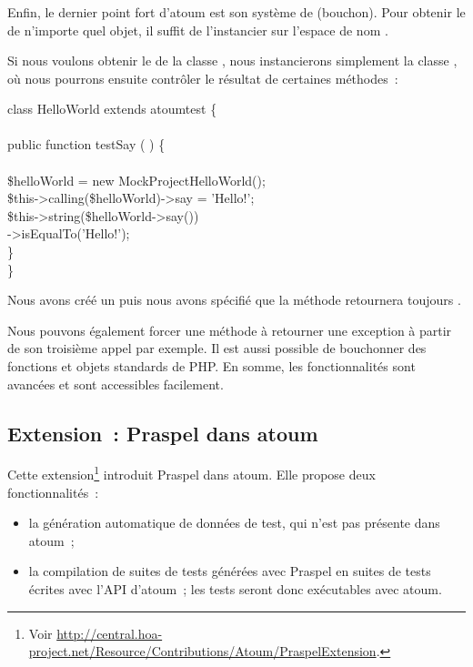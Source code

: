 \subsubsection{}

Enfin, le dernier point fort d'atoum est son système de 
(bouchon). Pour obtenir le  de n'importe quel objet, il suffit
de l'instancier sur l'espace de nom .

\begin{example}

Si nous voulons obtenir le  de la classe
, nous instancierons simplement la classe
, où nous pourrons ensuite
contrôler le résultat de certaines méthodes~:
%
\begin{pre}
class HelloWorld extends \bslash{}atoum\bslash{}test \{ \\
 \\
    public function testSay ( ) \{ \\
 \\
        \$helloWorld = new \bslash{}Mock\bslash{}Project\bslash{}HelloWorld(); \\
        \$this->calling(\$helloWorld)->say = 'Hello!'; \\
        \$this->string(\$helloWorld->say()) \\
                  ->isEqualTo('Hello!'); \\
    \} \\
\}
\end{pre}
%
Nous avons créé un  puis nous avons spécifié que la méthode
 retournera toujours .

\end{example}

Nous pouvons également forcer une méthode à retourner une exception à partir de
son troisième appel par exemple. Il est aussi possible de bouchonner des
fonctions et objets standards de PHP. En somme, les fonctionnalités sont
avancées et sont accessibles facilement.

\subsection{Extension~: Praspel dans atoum}
\label{subsection:tools:extension}

Cette extension\footnote{Voir
\url{http://central.hoa-project.net/Resource/Contributions/Atoum/PraspelExtension}.}
introduit Praspel dans atoum. Elle propose deux fonctionnalités~:
%
\begin{itemize}

\item la génération automatique de données de test, qui n'est pas présente dans
atoum~;

\item la compilation de suites de tests générées avec Praspel en suites de tests
écrites avec l'API d'atoum~; les tests seront donc exécutables avec atoum.

\end{itemize}

